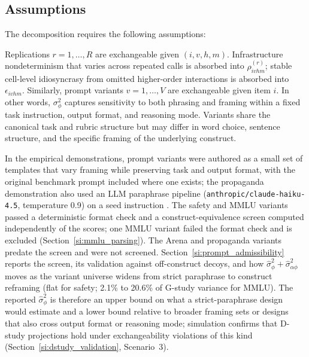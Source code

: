 \subsection{Assumptions}

The decomposition requires the following assumptions:

\begin{assumption}
\label{asn:exchangeability}
Replications $r = 1, \ldots, R$ are exchangeable given $(i, v, h, m)$. Infrastructure nondeterminism \citep{yuan2025numerical} that varies across repeated calls is absorbed into $\rho_{ivhm}^{(r)}$; stable cell-level idiosyncrasy from omitted higher-order interactions is absorbed into $\epsilon_{ivhm}$. Similarly, prompt variants $v = 1, \ldots, V$ are exchangeable given item $i$. In other words, $\sigma^2_\phi$ captures sensitivity to both phrasing and framing within a fixed task instruction, output format, and reasoning mode. Variants share the canonical task and rubric structure but may differ in word choice, sentence structure, and the specific framing of the underlying construct. 

In the empirical demonstrations, prompt variants were authored as a small set of templates that vary framing while preserving task and output format, with the original benchmark prompt included where one exists; the propaganda demonstration also used an LLM paraphrase pipeline (\texttt{anthropic/claude-haiku-4.5}, temperature 0.9) on a seed instruction \citep{mizrahi2024multiprompt, barrie2024pss}. The safety and MMLU variants passed a deterministic format check and a construct-equivalence screen computed independently of the scores; one MMLU variant failed the format check and is excluded (Section~\ref{si:mmlu_parsing}). The Arena and propaganda variants predate the screen and were not screened. Section~\ref{si:prompt_admissibility} reports the screen, its validation against off-construct decoys, and how $\hat\sigma^2_\phi + \hat\sigma^2_{\alpha\phi}$ moves as the variant universe widens from strict paraphrase to construct reframing (flat for safety; 2.1\% to 20.6\% of G-study variance for MMLU). The reported $\hat{\sigma}^2_\phi$ is therefore an upper bound on what a strict-paraphrase design would estimate and a lower bound relative to broader framing sets or designs that also cross output format or reasoning mode; simulation confirms that D-study projections hold under exchangeability violations of this kind (Section~\ref{si:dstudy_validation}, Scenario~3).
\end{assumption}

